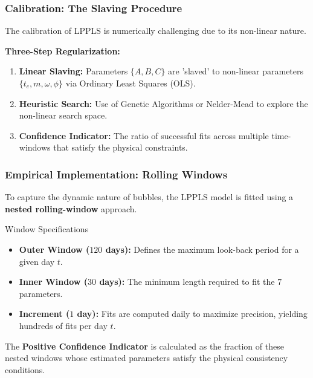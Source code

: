 \documentclass{beamer}
\begin{document}
\begin{frame}
\frametitle{Calibration: The Slaving Procedure}
    The calibration of LPPLS is numerically challenging due to its non-linear nature.
    
    \vspace{0.3cm}
    \textbf{Three-Step Regularization:}
    \begin{enumerate}
        \item \textbf{Linear Slaving:} Parameters $\{A, B, C\}$ are 'slaved' to non-linear parameters $\{t_c, m, \omega, \phi\}$ via Ordinary Least Squares (OLS).
        \item \textbf{Heuristic Search:} Use of Genetic Algorithms or Nelder-Mead to explore the non-linear search space.
        \item \textbf{Confidence Indicator:} The ratio of successful fits across multiple time-windows that satisfy the physical constraints.
    \end{enumerate}
\end{frame}

\begin{frame}
\frametitle{Empirical Implementation: Rolling Windows}
    To capture the dynamic nature of bubbles, the LPPLS model is fitted using a \textbf{nested rolling-window} approach.

    \vspace{0.3cm}
    \begin{block}{Window Specifications}
        \begin{itemize}
            \item \textbf{Outer Window ($120$ days):} Defines the maximum look-back period for a given day $t$.
            \item \textbf{Inner Window ($30$ days):} The minimum length required to fit the 7 parameters.
            \item \textbf{Increment ($1$ day):} Fits are computed daily to maximize precision, yielding hundreds of fits per day $t$.
        \end{itemize}
    \end{block}

    \vspace{0.2cm}
    The \textbf{Positive Confidence Indicator} is calculated as the fraction of these nested windows whose estimated parameters satisfy the physical consistency conditions.
\end{frame}
\end{document}
